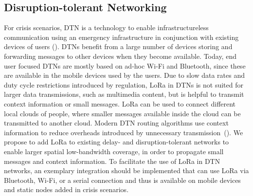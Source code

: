 \subsection{Disruption-tolerant Networking}
For crisis scenarios, DTN is a technology to enable infrastructureless communication using an emergency infrastructure in conjunction with existing devices of users (\cite{baumgaertner2016experimental,lieser2017architecture}). 
DTNs benefit from a large number of devices storing and forwarding messages to other devices when they become available. 
Today, end user focused DTNs are mostly based on ad-hoc Wi-Fi and Bluetooth, since these are available in the mobile devices used by the users. 
Due to slow data rates and duty cycle restrictions introduced by regulation, LoRa in DTNs is not suited for larger data transmissions, such as multimedia content, but is helpful to transmit context information or small messages.
LoRa can be used to connect different local clouds of people, where smaller messages available inside the cloud can be transmitted to another cloud. 
Modern DTN routing algorithms use context information to reduce overheads introduced by unnecessary transmission~(\cite{graubner2018opportunistic}). 
We propose to add LoRa to existing delay- and disruption-tolerant networks to enable larger spatial low-bandwidth coverage, in order to propagate small messages and context information. 
To facilitate the use of LoRa in DTN networks, an exemplary integration should be implemented that can use LoRa via Bluetooth, Wi-Fi, or a serial connection and thus is available on mobile devices and static nodes added in crisis scenarios.
